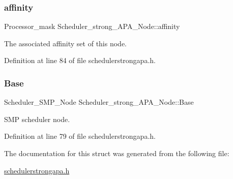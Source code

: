 \subsubsection{\texorpdfstring{affinity}{affinity}}
{\footnotesize\ttfamily Processor\+\_\+mask Scheduler\+\_\+strong\+\_\+\+A\+P\+A\+\_\+\+Node\+::affinity}



The associated affinity set of this node. 



Definition at line 84 of file schedulerstrongapa.\+h.

\mbox{\label{structScheduler__strong__APA__Node_ae86cbf5fd8743267abe33bed6d8b0fe6}} 
\subsubsection{\texorpdfstring{Base}{Base}}
{\footnotesize\ttfamily Scheduler\+\_\+\+S\+M\+P\+\_\+\+Node Scheduler\+\_\+strong\+\_\+\+A\+P\+A\+\_\+\+Node\+::\+Base}



S\+MP scheduler node. 



Definition at line 79 of file schedulerstrongapa.\+h.



The documentation for this struct was generated from the following file\+:\begin{DoxyCompactItemize}
\item 
\hyperlink{schedulerstrongapa_8h}{schedulerstrongapa.\+h}\end{DoxyCompactItemize}
